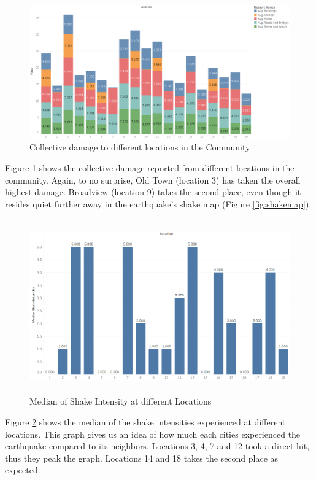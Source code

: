\documentclass[12pt]{extarticle}
\begin{document}
\begin{figure}[H]
\centering
	\includegraphics[height=0.43\linewidth, width=\linewidth]{Images/AllDamage.png}
	\caption{Collective damage to different locations in the Community}
	\label{fig:alldamage}
\end{figure}
 
 Figure \ref{fig:alldamage} shows the collective damage reported from different locations in the community. Again, to no surprise, Old Town (location 3) has taken the overall highest damage. Broadview (location 9) takes the second place, even though it resides quiet further away in the earthquake\rq{}s shake map (Figure \ref{fig:shakemap}). 

\begin{figure}[H]
\centering
	\includegraphics[height=75mm, width = 0.8\linewidth]{Images/ShakeInt.png}
	\caption{Median of Shake Intensity at different Locations}
	\label{fig:shakeint}
\end{figure}

Figure \ref{fig:shakeint} shows the median of the shake intensities experienced at different locations. This graph gives us an idea of how much each cities experienced the earthquake compared to its neighbors. Locations 3, 4, 7 and 12 took a direct hit, thus they peak the graph. Locations 14 and 18 takes the second place as expected. 
\end{document}
